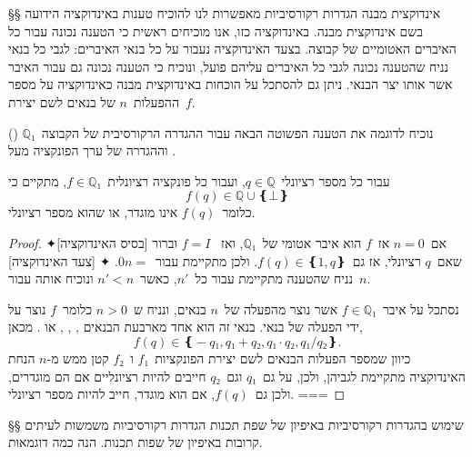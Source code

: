§§ אינדוקצית מבנה
הגדרות רקורסיביות מאפשרות לנו להוכיח טענות באינדוקציה הידועה בשם אינדוקצית
מבנה. באינדוקציה כזו, אנו מוכיחים ראשית כי הטענה נכונה עבור כל האיברים האטומיים
של קבוצה. בצעד האינדוקציה נעבור על כל בנאי האיברים: לגבי כל בנאי נניח שהטענה
נכונה לגבי כל האיברים עליהם פועל, ונוכיח כי הטענה נכונה גם עבור האיבר אשר אותו
יצר הבנאי. ניתן גם להסתכל על הוכחות באינדוקצית מבנה כאינדוקציה על מספר
ההפעלות~$n$ של בנאים לשם יצירת~$f$.

נוכיח לדוגמה את הטענה הפשוטה הבאה עבור ההגדרה הרקורסיבית של הקבוצה~$ℚ₁$
() וההגדרה של ערך הפונקציה מעל .

\begin{Claim}
  עבור כל מספר רציונלי~$q∈ℚ$, ועבור כל פונקציה רציונלית~$f∈ℚ₁$, מתקיים כי
  \begin{equation}\label{eq:Q}
    f(q)∈ℚ∪❴⊥❵
  \end{equation}
  כלומר~$f(q)$ אינו מוגדר, או שהוא מספר רציונלי.
\end{Claim}

\begin{proof}
  \mbox{}
  ✦[בסיס האינדוקציה] אם~$n=0$ אז~$f$ הוא איבר אטומי של~$ℚ₁$, ואז~%
  $f=I$ וברור שאם~$q$ רציונלי, אז גם~$f(q)∈❴1,q❵$. ולכן 
  מתקיימת עבור~$n=$0.
  ✦ [צעד האינדוקציה] נניח שהטענה  מתקיימת עבור כל~$n'$, כאשר~$n'<n$
  ונוכיח אותה עבור~$n$.

  נסתכל על איבר~$f∈ℚ₁$ אשר נוצר מהפעלה של~$n$ בנאים, ונניח ש~$n>0$ כלומר~$f$
  נוצר על ידי הפעלה של בנאי. בנאי זה הוא אחד מארבעת הבנאים ,
  , , או .
  מכאן, \[
    f(q)∈❴-q₁,q₁+q₂,q₁·q₂,q₁/q₂❵.
\] כיוון שמספר הפעלות הבנאים לשם יצירת הפונקציות~$f₁$ ו~$f₂$ קטן ממש מ-$n$ הנחת האינדוקציה מתקיימת לגביהן, ולכן, על גם~$q₁$ וגם~$q₂$ חייבים להיות רציונליים אם הם מוגדרים,
  ולכן גם~$f(q)$, אם הוא מוגדר, חייב להיות מספר רציונלי.
===
\end{proof}

§§ שימוש בהגדרות רקורסיביות באיפיון של שפת תכנות
הגדרות רקורסיביות משמשות לעיתים קרובות באיפיון של שפות תכנות.
הנה כמה דוגמאות.

